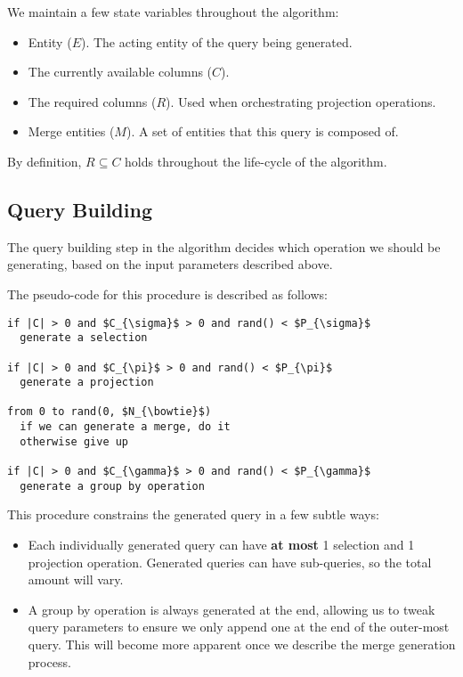 \documentclass[10pt, twocolumn]{article}
\begin{document}
We maintain a few state variables throughout the algorithm:

\begin{itemize}
  \item Entity ($E$). The acting entity of the query being generated.
  \item The currently available columns ($C$).
  \item The required columns ($R$). Used when orchestrating projection operations.
  \item Merge entities ($M$). A set of entities that this query is composed of.
\end{itemize}

\noindent
By definition, $R \subseteq C$ holds throughout the life-cycle of the algorithm.

\subsection*{Query Building}

The query building step in the algorithm decides which operation we should be generating, based on the input parameters described above.

\spacing
\noindent
The pseudo-code for this procedure is described as follows:

\spacing
\begin{lstlisting}
if |C| > 0 and $C_{\sigma}$ > 0 and rand() < $P_{\sigma}$
  generate a selection

if |C| > 0 and $C_{\pi}$ > 0 and rand() < $P_{\pi}$
  generate a projection

from 0 to rand(0, $N_{\bowtie}$)
  if we can generate a merge, do it
  otherwise give up

if |C| > 0 and $C_{\gamma}$ > 0 and rand() < $P_{\gamma}$
  generate a group by operation
\end{lstlisting}

\spacing
\noindent
This procedure constrains the generated query in a few subtle ways:

\begin{itemize}
  \item Each individually generated query can have \textbf{at most} 1 selection and 1 projection operation. Generated queries can have sub-queries, so the total amount will vary.
  \item A group by operation is always generated at the end, allowing us to tweak query parameters to ensure we only append one at the end of the outer-most query. This will become more apparent once we describe the merge generation process.
\end{itemize}
\end{document}
